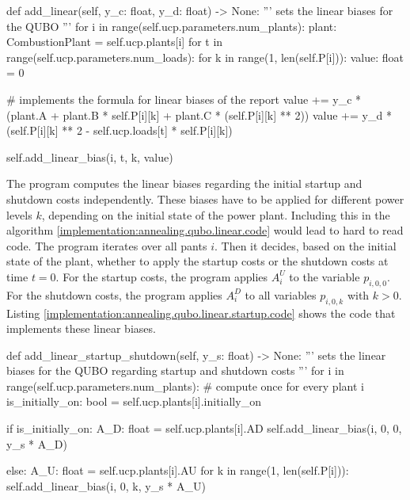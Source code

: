 \begin{python}[
  float,
  caption={Implementation of the Linear Biases for QUBOs},
  label={implementation:annealing.qubo.linear.code}
]
def add_linear(self, y_c: float, y_d: float) -> None:
  '''
  sets the linear biases for the QUBO
  '''
  for i in range(self.ucp.parameters.num_plants):
    plant: CombustionPlant = self.ucp.plants[i]
    for t in range(self.ucp.parameters.num_loads):
      for k in range(1, len(self.P[i])):
        value: float = 0

        # implements the formula for linear biases of the report
        value += y_c * (plant.A + plant.B * self.P[i][k] + plant.C * (self.P[i][k] ** 2))
        value += y_d * (self.P[i][k] ** 2 - self.ucp.loads[t] * self.P[i][k])

        self.add_linear_bias(i, t, k, value)
\end{python}

The program computes the linear biases regarding the initial startup and shutdown costs independently.
These biases have to be applied for different power levels $k$, depending on the initial state of the power plant.
Including this in the algorithm \ref{implementation:annealing.qubo.linear.code} would lead to hard to read code.
The program iterates over all pants $i$.
Then it decides, based on the initial state of the plant, whether to apply the startup costs or the shutdown costs at time $t = 0$.
For the startup costs, the program applies $A_i^U$ to the variable $p_{i, 0, 0}$.
For the shutdown costs, the program applies $A_i^D$ to all variables $p_{i, 0, k}$ with $k > 0$.
Listing \ref{implementation:annealing.qubo.linear.startup.code} shows the code that implements these linear biases.

\begin{python}[
  float,
  caption={Implementation of the Linear Startup and Shutdown Biases for QUBOs},
  label={implementation:annealing.qubo.linear.startup.code}
]
def add_linear_startup_shutdown(self, y_s: float) -> None:
  '''
  sets the linear biases for the QUBO regarding startup and shutdown costs
  '''
  for i in range(self.ucp.parameters.num_plants):
    # compute once for every plant i
    is_initially_on: bool = self.ucp.plants[i].initially_on

    if is_initially_on:
      A_D: float = self.ucp.plants[i].AD
      self.add_linear_bias(i, 0, 0, y_s * A_D)

    else:
      A_U: float = self.ucp.plants[i].AU
      for k in range(1, len(self.P[i])):
        self.add_linear_bias(i, 0, k, y_s * A_U)
\end{python}

